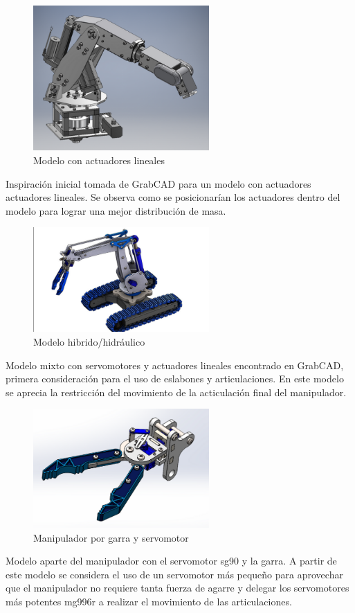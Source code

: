\begin{figure}[H]
  \centering
  \includegraphics[width=0.6\textwidth]{anexos/inspiraciones/1actuadores.png}
  \caption{Modelo con actuadores lineales}\label{fig:insp.actuadores}
\end{figure}
Inspiración inicial tomada de GrabCAD para un modelo con actuadores actuadores lineales. Se observa como se posicionarían los actuadores dentro del modelo para lograr una mejor distribución de masa.
\begin{figure}[H]
  \centering
  \includegraphics[width=0.6\textwidth]{anexos/inspiraciones/2oruga.png}
  \caption{Modelo hibrido/hidráulico}\label{fig:insp.oruga}
\end{figure}
Modelo mixto con servomotores y actuadores lineales encontrado en GrabCAD, primera consideración para el uso de eslabones y articulaciones. En este modelo se aprecia la restricción del movimiento de la acticulación final del manipulador.

\begin{figure}[H]
  \centering
  \includegraphics[width=0.6\textwidth]{anexos/inspiraciones/3orugaGarra.png}
  \caption{Manipulador por garra y servomotor}\label{fig:insp.orugaGarra}
\end{figure}
Modelo aparte del manipulador con el servomotor sg90 y la garra. A partir de este modelo se considera el uso de un servomotor más pequeño para aprovechar que el manipulador no requiere tanta fuerza de agarre y delegar los servomotores más potentes mg996r a realizar el movimiento de las articulaciones. 

